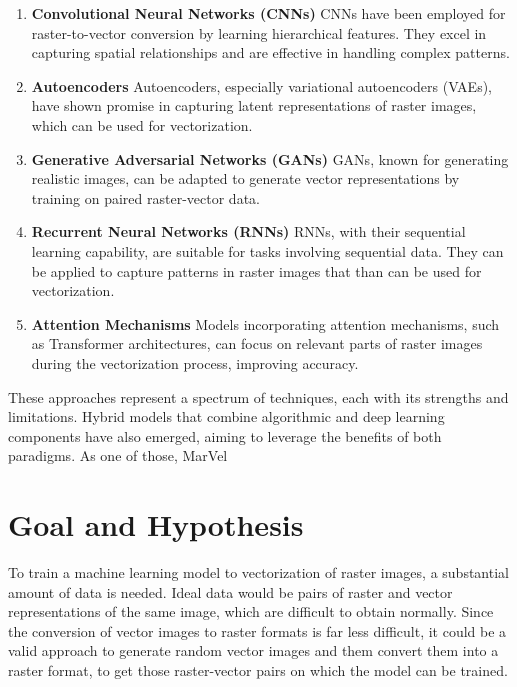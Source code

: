 \documentclass[12pt, a4paper, titlepage]{report}
\begin{document}
\begin{enumerate}[label=\Roman*]
   \item \textbf{Convolutional Neural Networks (CNNs)} CNNs have been employed for raster-to-vector conversion by learning hierarchical features. They excel in capturing spatial relationships and are effective in handling complex patterns.

   \item \textbf{Autoencoders} Autoencoders, especially variational autoencoders (VAEs), have shown promise in capturing latent representations of raster images, which can be used for vectorization.

   \item \textbf{Generative Adversarial Networks (GANs)} GANs, known for generating realistic images, can be adapted to generate vector representations by training on paired raster-vector data.

   \item \textbf{Recurrent Neural Networks (RNNs)} RNNs, with their sequential learning capability, are suitable for tasks involving sequential data. They can be applied to capture patterns in raster images that than can be used for vectorization.

   \item \textbf{Attention Mechanisms} Models incorporating attention mechanisms, such as Transformer architectures, can focus on relevant parts of raster images during the vectorization process, improving accuracy.
\end{enumerate}

These approaches represent a spectrum of techniques, each with its strengths and limitations. Hybrid models that combine algorithmic and deep learning components have also emerged, aiming to leverage the benefits of both paradigms. As one of those, MarVel




\chapter{Goal and Hypothesis}

To train a machine learning model to vectorization of raster images, a substantial amount of data is needed. Ideal data would be pairs of raster and vector representations of the same image, which are difficult to obtain normally. Since the conversion of vector images to raster formats is far less difficult, it could be a valid approach to generate random vector images and them convert them into a raster format, to get those raster-vector pairs on which the model can be trained.
\end{document}
